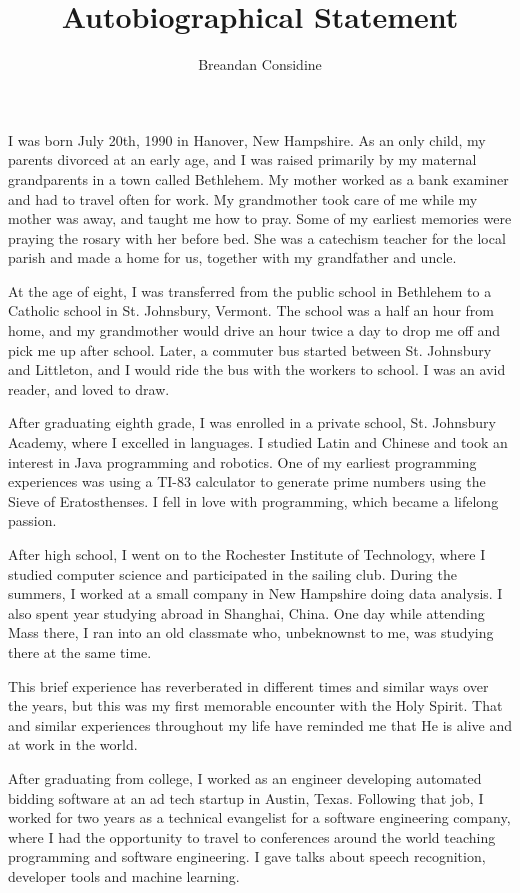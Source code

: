 \documentclass[11pt]{article}
\title{Autobiographical Statement}
\author{Breandan Considine}
\begin{document}
\maketitle
I was born July 20th, 1990 in Hanover, New Hampshire. As an only child, my parents divorced at an early age, and I was raised primarily by my maternal grandparents in a town called Bethlehem. My mother worked as a bank examiner and had to travel often for work. My grandmother took care of me while my mother was away, and taught me how to pray. Some of my earliest memories were praying the rosary with her before bed. She was a catechism teacher for the local parish and made a home for us, together with my grandfather and uncle.

At the age of eight, I was transferred from the public school in Bethlehem to a Catholic school in St. Johnsbury, Vermont. The school was a half an hour from home, and my grandmother would drive an hour twice a day to drop me off and pick me up after school. Later, a commuter bus started between St. Johnsbury and Littleton, and I would ride the bus with the workers to school. I was an avid reader, and loved to draw.

After graduating eighth grade, I was enrolled in a private school, St. Johnsbury Academy, where I excelled in languages. I studied Latin and Chinese and took an interest in Java programming and robotics. One of my earliest programming experiences was using a TI-83 calculator to generate prime numbers using the Sieve of Eratosthenses. I fell in love with programming, which became a lifelong passion.

After high school, I went on to the Rochester Institute of Technology, where I studied computer science and participated in the sailing club. During the summers, I worked at a small company in New Hampshire doing data analysis. I also spent year studying abroad in Shanghai, China. One day while attending Mass there, I ran into an old classmate who, unbeknownst to me, was studying there at the same time.

This brief experience has reverberated in different times and similar ways over the years, but this was my first memorable encounter with the Holy Spirit. That and similar experiences throughout my life have reminded me that He is alive and at work in the world.

After graduating from college, I worked as an engineer developing automated bidding software at an ad tech startup in Austin, Texas. Following that job, I worked for two years as a technical evangelist for a software engineering company, where I had the opportunity to travel to conferences around the world teaching programming and software engineering. I gave talks about speech recognition, developer tools and machine learning.
\end{document}

